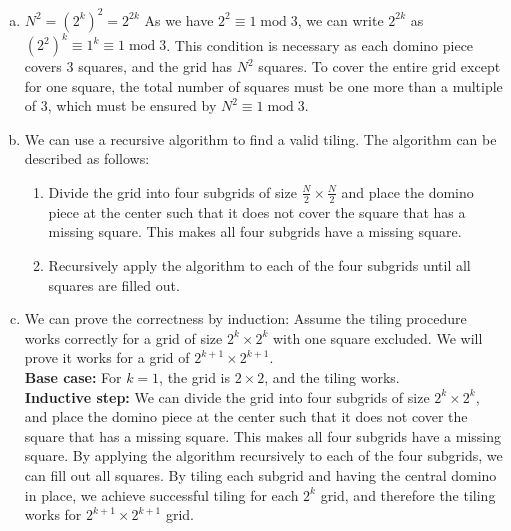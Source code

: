 \documentclass[10pt]{article}
\newcommand{\extraspace}{\medskip\noindent{\color{cit} Extra space for your solution}\newpage}
\begin{document}
\begin{solution}
    \noindent
    \begin{enumerate}[(a)]
        \item $N^2 = (2^k)^2 = 2^{2k}$ As we have $2^2 \equiv 1 \operatorname{mod} 3$, we can write $2^{2k}$ as $(2^2)^k \equiv 1^k \equiv 1 \operatorname{mod} 3$. This condition is necessary as each domino piece covers 3 squares, and the grid has $N^2$ squares.
        To cover the entire grid except for one square, the total number of squares must be one more than a multiple of 3, which must be ensured by $N^2 \equiv 1 \operatorname{mod} 3$.
        \item We can use a recursive algorithm to find a valid tiling. The algorithm can be described as follows:
        \begin{enumerate}[(1)]
            \item Divide the grid into four subgrids of size $\frac{N}{2} \times \frac{N}{2}$ and place the domino piece at the center such that it does not cover the square that has a missing square. This makes all four subgrids have a missing square.
            \item Recursively apply the algorithm to each of the four subgrids until all squares are filled out.
        \end{enumerate}
        \item We can prove the correctness by induction: Assume the tiling procedure works correctly for a grid of size $2^k \times 2^k$ with one square excluded. We will prove it works for a grid of $2^{k+1} \times 2^{k+1}$.\\
         \textbf{Base case:} For $k = 1$, the grid is $2 \times 2$, and the tiling works.\\
         \textbf{Inductive step:} We can divide the grid into four subgrids of size $2^{k} \times 2^{k}$, and place the domino piece at the center such that it does not cover the square that has a missing square. This makes all four subgrids have a missing square. By applying the algorithm recursively to each of the four subgrids, we can fill out all squares. 
            By tiling each subgrid and having the central domino in place, we achieve successful tiling for each $2^k$ grid, and therefore the tiling works for $2^{k+1} \times 2^{k+1}$ grid.
    \end{enumerate}
\end{solution}

\newpage
\extraspace
\end{document}
